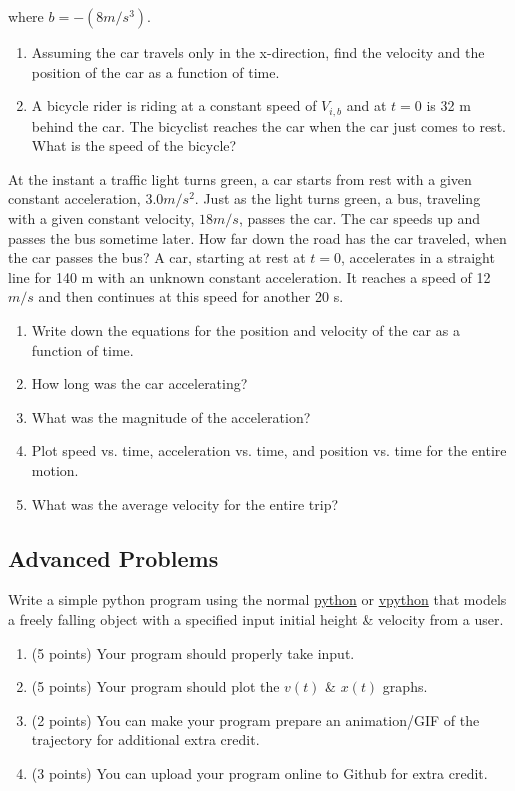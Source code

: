 \documentclass[12pt,addpoints]{exam}
\begin{document}
\begin{questions}
		where $b = -(8 m/s^3)$.
		\begin{enumerate}[label*=(\Alph*)]
			\item Assuming the car travels only in the x-direction, find the velocity and the position of the car as a function of time.
			\item A bicycle rider is riding at a constant speed of  $V_{i,b}$
			and at $t = 0$ is 32 m behind the car. The bicyclist reaches the car when the car just comes to rest. What is the speed of the bicycle?
		\end{enumerate}
		\question[15] At the instant a traffic light turns green, a car starts from rest with a given constant acceleration, $3.0m/s^{2}$. Just as the light turns green, a bus, traveling with a given constant velocity,  $18m/s$, passes the car. The car speeds up and passes the bus sometime later. How far down the road has the car traveled, when the car passes the bus?
		\question[15] A car, starting at rest at  $t=0$, accelerates in a straight line for 140 m with an unknown constant acceleration. It reaches a speed of 12 $m/s$ and then continues at this speed for another 20 s.
		\begin{enumerate}[label*=(\Alph*)]
			\item Write down the equations for the position and velocity of the car as a function of time.
			\item How long was the car accelerating?
			\item What was the magnitude of the acceleration?
			\item Plot speed vs. time, acceleration vs. time, and position vs. time for the entire motion.
			\item What was the average velocity for the entire trip?
		\end{enumerate}
		\subsection*{Advanced Problems}
		\question[15] Write a simple python program using the normal \href{https://python.org}{python} or \href{https://vpython.org/}{vpython} that models a freely falling object with a specified input initial height \& velocity from a user.
		\begin{enumerate}[label*=(\alph*)]
			\item (5 points) Your program should properly take input.
			\item (5 points) Your program should plot the $v(t)$ \& $x(t)$ graphs.
			\item (2 points) You can make your program prepare an animation/GIF of the trajectory for additional extra credit. 
			\item (3 points) You can upload your program online to Github for extra credit.
		\end{enumerate}
	\end{questions}
\end{document}
